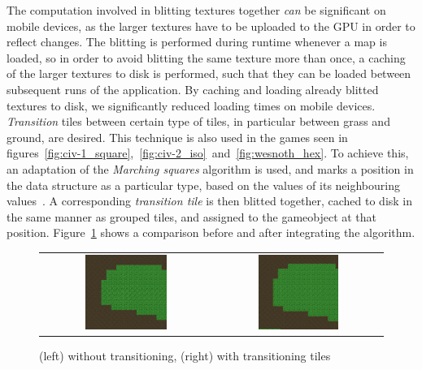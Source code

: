 The computation involved in blitting textures together \textit{can} be significant on mobile devices, as the larger textures have to be uploaded to the GPU in order to reflect changes.
The blitting is performed during runtime whenever a map is loaded, so in order to avoid blitting the same texture more than once, a caching of the larger textures to disk is performed, such that they can be loaded between subsequent runs of the application.
By caching and loading already blitted textures to disk, we significantly reduced loading times on mobile devices.\\

\textit{Transition} tiles between certain type of tiles, in particular between grass and ground, are desired.
This technique is also used in the games seen in figures~\ref{fig:civ-1_square},~\ref{fig:civ-2_iso}~and~\ref{fig:wesnoth_hex}.
To achieve this, an adaptation of the \textit{Marching squares} algorithm is used, and marks a position in the data structure as a particular type, based on the values of its neighbouring values~\cite{marching-squares}.
A corresponding \textit{transition tile} is then blitted together, cached to disk in the same manner as grouped tiles, and assigned to the gameobject at that position.
Figure~\ref{fig:transition_comparison} shows a comparison before and after integrating the algorithm.

\begin{figure}[H]
    \centering
    \begin{tabular}{cc}
        \includegraphics[width=0.5\textwidth]{figures/generating_levels/no_transition.png}
        &
        \includegraphics[width=0.5\textwidth]{figures/generating_levels/with_transition.png}
    \end{tabular}
    \caption{(left) without transitioning, (right) with transitioning tiles}\label{fig:transition_comparison}
\end{figure}

